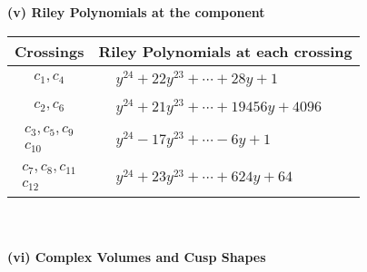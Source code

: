 \documentclass[1p]{elsarticle_modified}
\theoremstyle{definition}
\begin{document}
\newpage\renewcommand{\arraystretch}{1}
\flushleft \textbf{(v) Riley Polynomials at the component}\newline \\
\begin{tabular}{m{50pt}|m{274pt}}
Crossings & \hspace{64pt}Riley Polynomials at each crossing \\
\hline $$\begin{aligned}c_{1},c_{4}\end{aligned}$$&$\begin{aligned}
&y^{24}+22 y^{23}+\cdots+28 y+1
\end{aligned}$\\
\hline $$\begin{aligned}c_{2},c_{6}\end{aligned}$$&$\begin{aligned}
&y^{24}+21 y^{23}+\cdots+19456 y+4096
\end{aligned}$\\
\hline $$\begin{aligned}c_{3},c_{5},c_{9}\\c_{10}\end{aligned}$$&$\begin{aligned}
&y^{24}-17 y^{23}+\cdots-6 y+1
\end{aligned}$\\
\hline $$\begin{aligned}c_{7},c_{8},c_{11}\\c_{12}\end{aligned}$$&$\begin{aligned}
&y^{24}+23 y^{23}+\cdots+624 y+64
\end{aligned}$\\
\hline
\end{tabular}\\~\\
\newpage\flushleft \textbf{(vi) Complex Volumes and Cusp Shapes}
\end{document}
